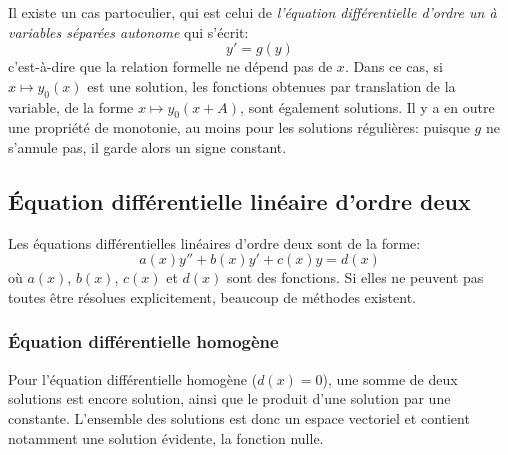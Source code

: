 Il existe un cas partoculier, qui est celui de \emph{l'équation différentielle d'ordre un à variables séparées autonome} qui s'écrit:
\begin{equation}
y' = g(y)
\end{equation}
c'est-à-dire que la relation formelle ne dépend pas de $x$. Dans ce cas, si $x \mapsto y_0(x)$ est une solution, les fonctions obtenues par translation de la variable, de la forme $x \mapsto y_0(x+A)$, sont également solutions. Il y a en outre une propriété de monotonie, au moins pour les solutions régulières: puisque $g$ ne s'annule pas, il garde alors un signe constant. 
 
\subsection{Équation différentielle linéaire d'ordre deux} 
Les équations différentielles linéaires d'ordre deux sont de la forme:
\begin{equation}
a(x)y'' + b(x)y' + c(x)y = d(x)
\end{equation}
où $a(x)$, $b(x)$, $c(x)$ et $d(x)$ sont des fonctions. Si elles ne peuvent pas toutes être résolues explicitement, beaucoup de méthodes existent. 
\subsubsection{Équation différentielle homogène} Pour l'équation différentielle homogène ($d(x)=0$), une somme de deux solutions est encore solution, ainsi que le produit d'une solution par une constante. L'ensemble des solutions est donc un espace vectoriel et contient notamment une solution évidente, la fonction nulle. 
